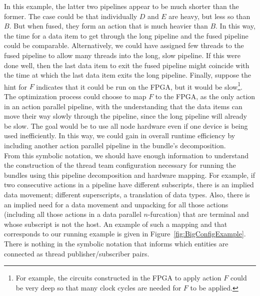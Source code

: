 \documentclass{article}
\begin{document}
In this example, the latter two pipelines appear to be much shorter than the
former.  The case could be that individually $D$ and $E$ are heavy, but
less so than $B$.  But when fused, they form an action that is much heavier
than $B$.  In this way, the time for a data item to get through the long
pipeline and the fused pipeline could be comparable.  Alternatively, we could
have assigned few threads to the fused pipeline to allow many threads
into the long, slow pipeline.  If this were done well, then the last data
item to exit the fused pipeline might coincide with the time at which the last
data item exits the long pipeline.  Finally, suppose the hint for $F$
indicates that it could be run on the FPGA, but it would be slow\footnote{For
example, the circuits constructed in the FPGA to apply action $F$ could be very
deep so that many clock cycles are needed for $F$ to be applied.}.  The
optimization process could choose to map $F$ to the FPGA, as the only action in
an action parallel pipeline, with the understanding that the data items can move
their way slowly through the pipeline, since the long pipeline will already be
slow.  The goal would be to use all node hardware even if one device is being
used inefficiently.  In this way, we could gain in overall runtime efficiency by
including another action parallel pipeline in the bundle's decomposition.\\

From this symbolic notation, we should have enough information to understand the construction
of the
thread team configuration necessary for running the
bundles using this pipeline decomposition and hardware mapping.  For example, if
two consecutive actions in a pipeline have different subscripts, there is an
implied data movement; different superscripts, a translation of data types.
Also, there is an implied need for a data movement and unpacking for all those
actions (including all those actions in a data parallel $n$-furcation) that are
terminal and whose subscript is not the host.  An example of such a mapping and
that
corresponds to our running example is given in
Figure~\ref{fig:BigConfigExample}.  There is nothing in the
symbolic notation that informs which entities are connected as thread
publisher/subscriber pairs.\\
\end{document}
